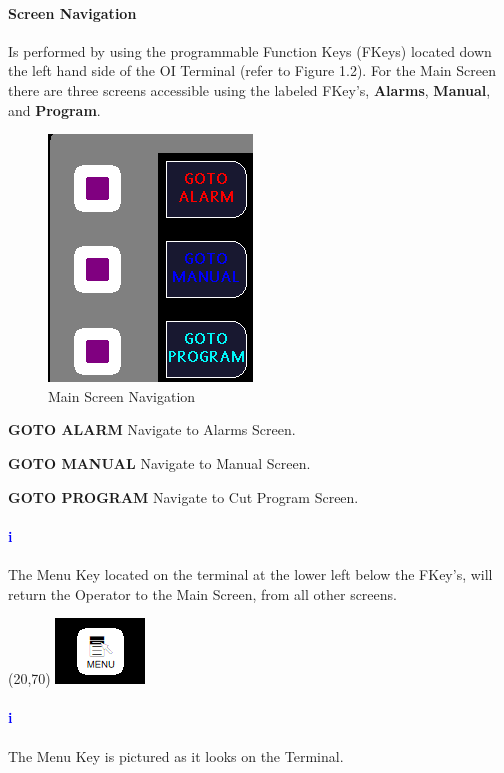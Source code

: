 \paragraph*{Screen Navigation}Is performed by using the programmable Function Keys (FKeys) located down the left hand side of the OI Terminal (refer to Figure 1.2). For the Main Screen there are three screens accessible using the labeled FKey's, \textbf{Alarms}, \textbf{Manual}, and \textbf{Program}.
\begin{figure}
		\centering
		\includegraphics[width=.3\linewidth]{screen-captures/main-nav}
		\caption{Main Screen Navigation}
		\label{fig:main-nav}
\end{figure}
\begin{list}{-}{}
	\item \textbf{GOTO ALARM} Navigate to Alarms Screen.
	\item \textbf{GOTO MANUAL} Navigate to Manual Screen.
	\item \textbf{GOTO PROGRAM} Navigate to Cut Program Screen.
\end{list}

\paragraph*{\textbf{\LARGE \textcolor{blue}{i}}}
The Menu Key located on the terminal at the lower left below the FKey's, will return the Operator to the Main Screen, from all other screens.\\
\begin{minipage}{4cm}
	\begin{picture}(20,70)
	\includegraphics[width=.5\linewidth]{screen-captures/menu}
	\end{picture}
\end{minipage}\begin{minipage}[]{11cm}
\paragraph{\textbf{\LARGE \textcolor{blue}{i}}} The Menu Key is pictured as it looks on the Terminal.
\end{minipage}
\pagebreak
